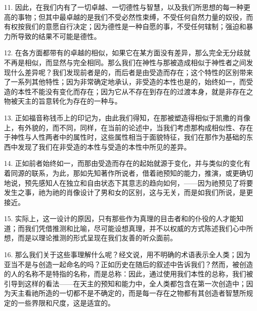 11. 因此，在我们内有了一切卓越、一切德性与智慧，以及我们所思想的每一种更高的事物；但其中最卓越的是我们不受必然性束缚，不受任何自然力量的奴役，而有权按我们的意愿自行决定；因为德性是一种自愿的事，不受任何辖制；强迫和暴力所导致的结果不可能是德性。\par

12. 在各方面都带有的卓越的相似，如果它在某方面没有差异，那么完全无分歧就不再是相似，而显然与完全相同。那么我们在神性与那被造成相似于神性者之间发现什么差异呢？我们发现前者是的，而后者是由受造而存在；这个特性的区别带来了一系列其他特性；因为非常确定地承认，非受造的本性也是的，始终如一，而受造的本性不能没有变化而存在；因为它从不存在到存在的过渡本身，就是非存在之物被天主的旨意转化为存在的一种与。\par

13. 正如福音称钱币上的印记为，由此我们得知，在那被塑造得相似于凯撒的肖像上，有外貌的，而不同，同样，在当前的论述中，当我们考虑那构成相似性、存在于神性与人性两者中的属性时，这些属性相当于面貌特征，我们在那作为基础的东西中发现了我们在非受造的本性与受造的本性中所见的差异。\par

14. 正如前者始终如一，而那由受造而存在的起始就源于变化，并与类似的变化有着同源的联系，为此，那如先知著作所说者，借着祂预知的能力，推演，或更确切地说，预先感知人在独立和自由状态下其意志的趋向如何，——因为祂预见了将要发生之事，祂为祂的肖像设计了男和女的区别，这与无关，而是如我们所说，是更接近。\par

15. 实际上，这一设计的原因，只有那些作为真理的目击者和的仆役的人才能知道；而我们凭借推测和比喻，尽可能设想真理，并不以权威的方式陈述我们心中所想，而是以理论推测的形式呈现在我们友善的听众面前。\par

16. 那么我们关于这些事理解什么呢？经文说，用不明确的术语表示全人类；因为亚当不是与创造一起命名的吗？正如历史在随后的叙述中告诉我们？然而，被创造的人的名称不是特指的名称，而是总称：因此，通过使用我们本性的总称，我们被引导到这样的看法——在天主的预知和能力中，全人类都包含在第一次创造中；因为天主看祂所造的一切都不是不确定的，而是每一存在之物都有其创造者智慧所规定的一些界限和尺度，这是适宜的。\par

